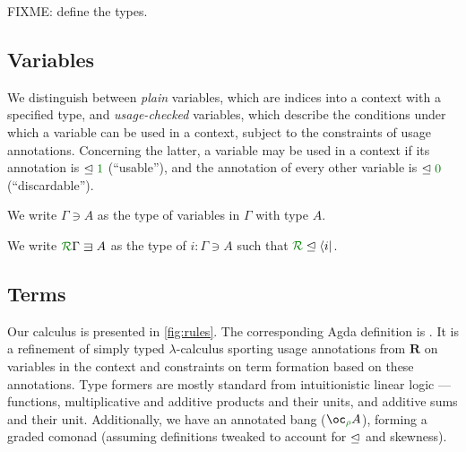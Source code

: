 \documentclass[submission,copyright,creativecommons]{eptcs}
\begin{document}
FIXME: define the types.

\subsection{Variables}

We distinguish between \emph{plain} variables, which are indices into
a context with a specified type, and \emph{usage-checked} variables,
which describe the conditions under which a variable can be used in a
context, subject to the constraints of usage annotations.  Concerning
the latter, a variable may be used in a context if its annotation is
$\subres \rescomment 1$ (``usable''), and the annotation of every
other variable is $\subres \rescomment 0$ (``discardable'').

\begin{definition}
  We write $\Gamma \ni A$ as the type of variables in $\Gamma$ with type $A$.
\end{definition}

\begin{definition}
  We write $\ctx{\Gamma}{R} \lvar A$ as the type of $i : \Gamma \ni A$ such that
  $\resctx R \subres \langle i \rvert$.
\end{definition}

\subsection{Terms}

Our calculus is presented in \autoref{fig:rules}.
The corresponding Agda definition is .
It is a refinement of simply typed $\lambda$-calculus sporting usage annotations
from $\mathbf R$ on variables in the context and constraints on term formation
based on these annotations.
Type formers are mostly standard from intuitionistic linear logic --- functions,
multiplicative and additive products and their units, and additive sums and
their unit.
Additionally, we have an annotated bang ($\excl{\rho}{A}$), forming a graded
comonad (assuming definitions tweaked to account for $\trianglelefteq$ and skewness).
\end{document}
